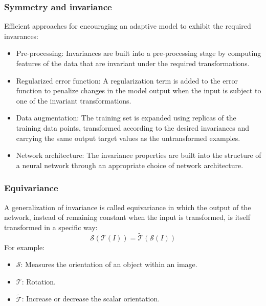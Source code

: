 \documentclass{beamer}
\begin{document}
\begin{frame}
    \frametitle{Symmetry and invariance}
    Efficient approaches for encouraging an adaptive model to exhibit the required invarances:
    \begin{itemize}
        \item Pre-processing: Invariances are built into a pre-processing stage by computing features of the data that are invariant under the required transformations.
        \item Regularized error function: A regularization term is added to the error function to penalize changes in the model output when the input is subject to one of the invariant transformations.
        \item Data augmentation: The training set is expanded using replicas of the training data points, transformed according to the desired invariances and carrying the same output target values as the untransformed examples.
        \item Network architecture: The invariance properties are built into the structure of a neural network through an appropriate choice of network architecture.
    \end{itemize}
\end{frame}

\begin{frame}
    \frametitle{Equivariance}
    A generalization of invariance is called equivariance in which the output of the network, instead of remaining constant when the input is transformed, is itself transformed in a specific way:
    \begin{equation*}
        \mathcal{S}(\mathcal{T}(I))=\tilde{\mathcal{T}}(\mathcal{S}(I))
    \end{equation*}
    For example:
    \begin{itemize}
        \item $\mathcal{S}$: Measures the orientation of an object within an image.
        \item $\mathcal{T}$: Rotation.
        \item $\tilde{\mathcal{T}}$: Increase or decrease the scalar orientation.
    \end{itemize}
\end{frame}
\end{document}
